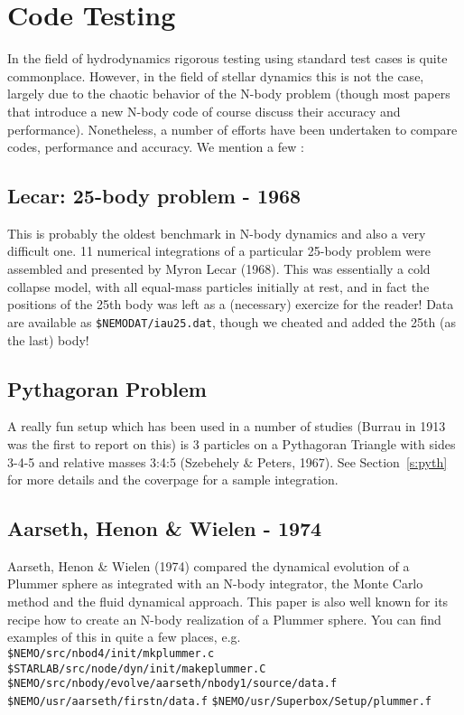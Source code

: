 \chapter                {Code Testing}

In the field of hydrodynamics rigorous testing using standard
test cases is quite commonplace. However, 
in the field of stellar dynamics this is not the case, largely due to
the chaotic behavior of the N-body problem 
(though
most papers that introduce a new N-body code of course discuss
their accuracy and performance).
Nonetheless, a
number of efforts have been undertaken to compare codes, performance and
accuracy. We mention a few :


\section{Lecar: 25-body problem - 1968}

This is probably the oldest benchmark in N-body dynamics and also a
very difficult one.
11 numerical integrations of a particular
25-body problem were assembled and presented
by Myron Lecar (1968).
This was essentially a cold collapse model, with all equal-mass 
particles initially at rest, and
in fact the positions of the 25th body was left as a (necessary)
exercize for the reader!
Data are available as {\tt \$NEMODAT/iau25.dat}, though we 
cheated and added the 25th (as the last) body!

\section{Pythagoran Problem}

A really fun setup which has been used in a number of studies
(Burrau in 1913 was the first to report on this)
is 3 particles on a Pythagoran Triangle with sides 3-4-5 
and relative masses 3:4:5 (Szebehely \& Peters, 1967).
See Section~\ref{s:pyth} for more details and the
coverpage for a sample integration.


\section{Aarseth, Henon \& Wielen - 1974}

Aarseth, Henon \& Wielen (1974) compared the dynamical evolution of a 
Plummer sphere as integrated with an N-body integrator,
the Monte Carlo method and the fluid dynamical approach.
This paper is also well known for its recipe how to create
an N-body realization of a Plummer sphere. You can find examples
of this in quite a few places, e.g.\\
{\tt \$NEMO/src/nbod4/init/mkplummer.c}\\
{\tt \$STARLAB/src/node/dyn/init/makeplummer.C}\\
{\tt \$NEMO/src/nbody/evolve/aarseth/nbody1/source/data.f}\\
{\tt \$NEMO/usr/aarseth/firstn/data.f}
{\tt \$NEMO/usr/Superbox/Setup/plummer.f}

